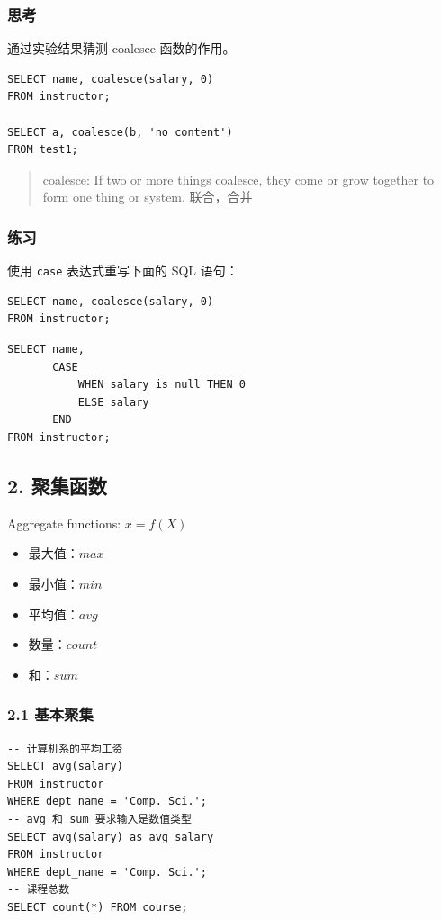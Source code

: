 \documentclass[aspectratio=169, 14pt]{beamer}
\begin{document}
\begin{frame}[fragile]
	\frametitle{思考}

	通过实验结果猜测 \alert{coalesce} 函数的作用。

	\begin{verbatim}
SELECT name, coalesce(salary, 0)
FROM instructor;

SELECT a, coalesce(b, 'no content')
FROM test1;
\end{verbatim}

	\begin{quote}
		coalesce: If two or more things coalesce, they come or grow together to form one thing or system. 联合，合并
	\end{quote}

\end{frame}

\begin{frame}[fragile]
	\frametitle{练习 {\large {}} }
	使用 \texttt{case} 表达式重写下面的 SQL 语句：

	\begin{verbatim}
SELECT name, coalesce(salary, 0)
FROM instructor;
\end{verbatim}

	\pause
	\begin{verbatim}
SELECT name,
       CASE
           WHEN salary is null THEN 0
           ELSE salary
       END
FROM instructor;
\end{verbatim}

\end{frame}

\begin{frame}
	\section{\textcolor{darkmidnightblue}{2. 聚集函数}}
	Aggregate functions: $x = f(X)$

	\begin{itemize}
		\item 最大值：$max$
		\item 最小值：$min$
		\item 平均值：$avg$
		\item 数量：$count$
		\item 和：$sum$
	\end{itemize}

\end{frame}

\begin{frame}[fragile]
	\frametitle{2.1 基本聚集}
	\begin{verbatim}
-- 计算机系的平均工资
SELECT avg(salary)
FROM instructor
WHERE dept_name = 'Comp. Sci.';
-- avg 和 sum 要求输入是数值类型
SELECT avg(salary) as avg_salary
FROM instructor
WHERE dept_name = 'Comp. Sci.';
-- 课程总数
SELECT count(*) FROM course;
\end{verbatim}
\end{frame}
\end{document}
